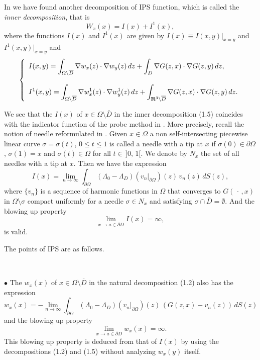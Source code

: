 In \cite{IPS} we have found another decomposition of IPS function, which is called the {\it inner decomposition}, that is
$$\displaystyle
W_x(x)=I(x)+I^1(x),
\tag {1.5}
$$
where the functions $I(x)$ and $I^1(x)$ are given by
$I(x)\equiv I(x,y)\vert_{x=y}$ and $I^1(x,y)\vert_{x=y}$ and
$$
\left\{
\begin{array}{l}
\displaystyle
I(x,y)=\int_{\Omega\setminus\overline{D}}\nabla w_x(z)\cdot\nabla w_y(z)\,dz
+\int_D\nabla G(z,x)\cdot\nabla G(z,y)\,dz,
\\
\\
\displaystyle
I^1(x,y)=
\int_{\Omega\setminus\overline{D}}\nabla w_x^1(z)\cdot\nabla w_y^1(z)\,dz
+\int_{\Bbb R^3\setminus\overline{D}}
\nabla G(z,x)\cdot\nabla G(z,y)\,dz.
\end{array}
\right.
$$



We see that  the $I(x)$ of $x\in\Omega\setminus\overline{D}$ in the inner decomposition (1.5) coincides with the indicator function of the probe method in \cite{INew}.
More precisely, recall the notion of needle reformulated in \cite{INew}.
Given $x\in\Omega$ a non self-intersecting piecewise linear curve $\sigma=\sigma(t)$, $0\le t\le 1$ is called a needle
with a tip at $x$ if $\sigma(0)\in\partial\Omega$, $\sigma(1)=x$ and $\sigma(t)\in\Omega$ for all $t\in\,]0,\,1[$.
We denote by $N_x$ the set of all needles with a tip at $x$.
Then we have the expression
$$\displaystyle
I(x)=\lim_{n\rightarrow\infty}
\int_{\partial\Omega}(\Lambda_0-\Lambda_D)(v_n\vert_{\partial\Omega})(z)\,
v_n(z)\,dS(z),
$$
where $\{v_n\}$ is a sequence of harmonic functions in $\Omega$ that converges to $G(\,\cdot\,,x)$ in $\Omega\setminus\sigma$ compact uniformly for a needle $\sigma\in N_x$
and satisfying $\sigma\cap\overline{D}=\emptyset$.
And the blowing  up property
$$\displaystyle
\lim_{x\rightarrow a\in\partial D} I(x)=\infty,
$$
is valid.

The points of  IPS are as follows.

$\quad$

\noindent
$\bullet$ The $w_x(x)$ of $x\in\Omega\setminus\overline{D}$ in the natural decomposition (1.2)
also has the expression
$$\displaystyle
w_x(x)=-\lim_{n\rightarrow\infty}
\int_{\partial\Omega}(\Lambda_0-\Lambda_D)(v_n\vert_{\partial\Omega})(z)\,
(G(z,x)-v_n(z))\,dS(z)
$$
and the blowing  up property
$$\displaystyle
\lim_{x\rightarrow a\in\partial D} w_x(x)=\infty.
$$
This blowing up property is deduced from that of $I(x)$ by using the decompositions (1.2) and (1.5)
without analyzing $w_x(y)$ itself.

